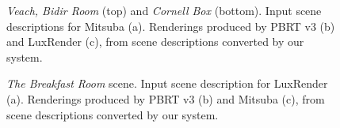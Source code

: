 \begin{figure}
{}	
\caption{\textit{Veach, Bidir Room} (top) and \textit{Cornell Box} (bottom). Input scene descriptions for 
 Mitsuba (a). Renderings produced by PBRT v3 (b) and LuxRender (c),
 from scene descriptions converted by our system.}
\label{fig:bidir-cornell}
\end{figure}

\begin{figure}
\centering
{}	
\caption{\textit{The Breakfast Room} scene. Input scene description for LuxRender (a).
	Renderings produced by PBRT v3 (b) and Mitsuba (c),
	from scene descriptions converted by our system. }
\label{fig:dining-room}
\end{figure}

